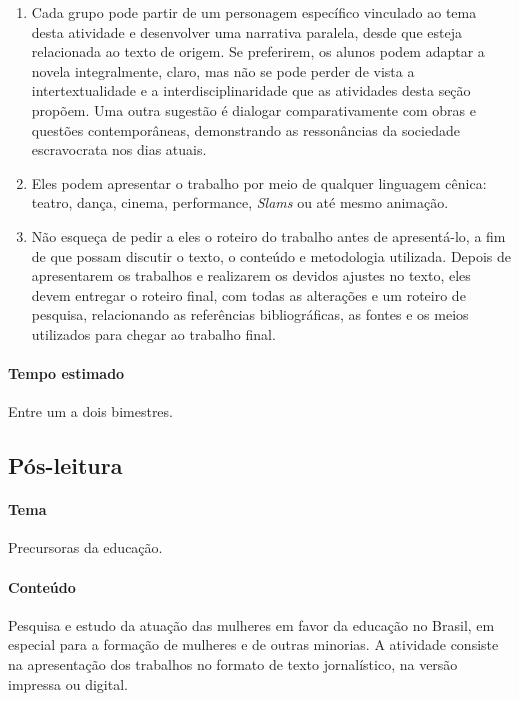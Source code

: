 \documentclass[12pt]{extarticle}
\begin{document}
\begin{enumerate}
\item
Cada grupo pode partir de um personagem específico vinculado ao tema
desta atividade e desenvolver uma narrativa paralela, desde que esteja
relacionada ao texto de origem. Se preferirem, os alunos podem adaptar a
novela integralmente, claro, mas não se pode perder de vista a
intertextualidade e a interdisciplinaridade que as atividades desta
seção propõem. Uma outra sugestão é dialogar comparativamente com obras
e questões contemporâneas, demonstrando as ressonâncias da sociedade
escravocrata nos dias atuais.

\item
Eles podem apresentar o trabalho por meio de qualquer linguagem
cênica: teatro, dança, cinema, performance, \emph{Slams} ou até mesmo
animação.

\item
Não esqueça de pedir a eles o roteiro do trabalho antes de
apresentá-lo, a fim de que possam discutir o texto, o conteúdo e
metodologia utilizada. Depois de apresentarem os trabalhos e realizarem
os devidos ajustes no texto, eles devem entregar o roteiro final, com
todas as alterações e um roteiro de pesquisa, relacionando as
referências bibliográficas, as fontes e os meios utilizados para chegar
ao trabalho final.
\end{enumerate}

\paragraph{Tempo estimado} Entre um a dois bimestres.


\subsection{Pós-leitura}

\paragraph{Tema} Precursoras da educação.


\paragraph{Conteúdo} Pesquisa e estudo da atuação das mulheres em favor da
educação no Brasil, em especial para a formação de mulheres e de outras
minorias. A atividade consiste na apresentação dos trabalhos no formato
de texto jornalístico, na versão impressa ou digital.
\end{document}
